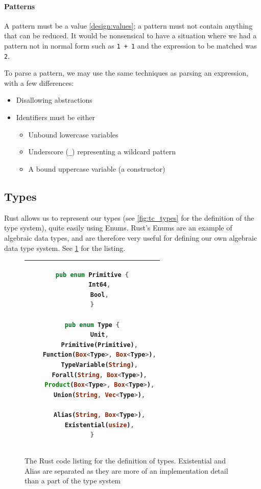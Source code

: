 \paragraph{Patterns}
\label{impl:parsing_patterns}
A pattern must be a value \ref{design:values}; a pattern must not contain anything that can be reduced. It would be nonsensical to have a situation where we had a pattern not in normal form such as \verb|1 + 1| and the expression to be matched was \verb|2|. 

To parse a pattern, we may use the same techniques as parsing an expression, with a few differences:
\begin{itemize}
    \item Disallowing abstractions
    \item Identifiers must be either
    \begin{itemize}
        \item Unbound lowercase variables
        \item Underscore (\verb|_|) representing a wildcard pattern
        \item A bound uppercase variable (a constructor)
    \end{itemize}
\end{itemize}

\subsection{Types}

Rust allows us to represent our types (see \ref{fig:tc_types} for the definition of the type system), quite easily using Enums. Rust's Enums are an example of algebraic data types, and are therefore very useful for defining our own algebraic data type system. See \ref{fig:type_lst} for the listing. 

\begin{figure}[ht]
    \centering
    \begin{tabular}{c}
    \hline
    \begin{lstlisting}[language=Rust]
pub enum Primitive {
    Int64,
    Bool,
}

pub enum Type {
    Unit,
    Primitive(Primitive),
    Function(Box<Type>, Box<Type>),
    TypeVariable(String),
    Forall(String, Box<Type>),
    Product(Box<Type>, Box<Type>),
    Union(String, Vec<Type>),

    Alias(String, Box<Type>),
    Existential(usize),
}
\end{lstlisting}
    \\\hline
    \end{tabular}
    \caption{The Rust code listing for the definition of types. Existential and Alias are separated as they are more of an implementation detail than a part of the type system}
    \label{fig:type_lst}
\end{figure}

